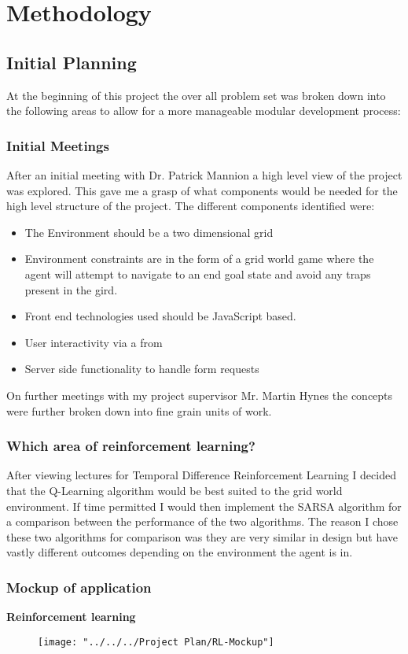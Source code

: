 \chapter{Methodology}
\section{Initial Planning}
At the beginning of this project the over all problem set was broken down into the following areas to allow for a more manageable modular development process:

\subsection {Initial Meetings}
After an initial meeting with Dr. Patrick Mannion a high level view of the project was explored. This gave me a grasp of what components would be needed for the high level structure of the project.
The different components identified were:
\begin{itemize}
	\item The Environment should be a two dimensional grid 
	\item Environment constraints are in the form of a grid world game where the agent will attempt to navigate to an end goal state and avoid any traps present in the gird.
	\item Front end technologies used should be JavaScript based.
	\item User interactivity via a from 
	\item Server side functionality to handle form requests
\end{itemize}

On further meetings with my project supervisor Mr. Martin Hynes the concepts were further broken down into fine grain units of work.
\subsection {Which area of reinforcement learning?}
After viewing lectures for Temporal Difference Reinforcement Learning I decided that the Q-Learning algorithm would be best suited to the grid world environment. If time permitted I would then implement the SARSA algorithm for a comparison between the performance of the two algorithms.
The reason I chose these two algorithms for comparison was they are very similar in design but have vastly different outcomes depending on the environment the agent is in. 
\subsection {Mockup of application}
\textbf{Reinforcement learning}\\
\begin{figure}[H]
	\centering
	\texttt{[image: "../../../Project Plan/RL-Mockup"]}
	\caption{}
	\label{fig:gridworldenv}
\end{figure}

